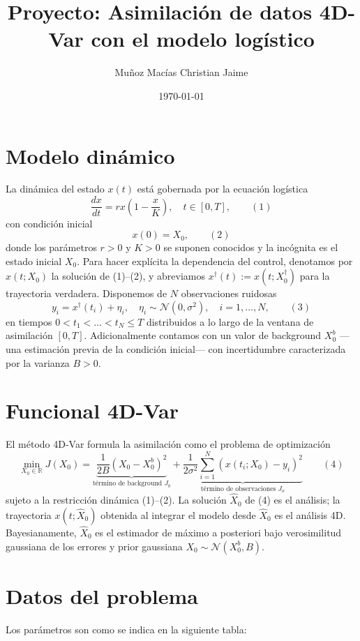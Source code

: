 \documentclass[12pt,spanish,mexico]{article}
\title{Proyecto: Asimilación de datos 4D-Var con el modelo logístico}
\author{Muñoz Macías Christian Jaime}
\date{\today}
\numberwithin{equation}{section}
\theoremstyle{definition}
\theoremstyle{remark}
\begin{document}
\maketitle

\section{Modelo dinámico}
La dinámica del estado \(x(t)\) está gobernada por la ecuación logística
\[
\frac{dx}{dt} = r x \left(1 - \frac{x}{K}\right), \quad t \in [0, T], \qquad (1)
\]
con condición inicial
\[
x(0) = X_0, \qquad (2)
\]
donde los parámetros \(r > 0\) y \(K > 0\) se suponen conocidos y la incógnita es el estado inicial \(X_0\). Para hacer explícita la dependencia del control, denotamos por \(x(t; X_0)\) la solución de (1)–(2), y abreviamos \(x^\dagger(t) := x(t; X_0^\dagger)\) para la trayectoria verdadera. Disponemos de \(N\) observaciones ruidosas
\[
y_i = x^\dagger(t_i) + \eta_i, \quad \eta_i \sim \mathcal{N}(0, \sigma^2), \quad i = 1, \dots, N, \qquad (3)
\]
en tiempos \(0 < t_1 < \dots < t_N \leq T\) distribuidos a lo largo de la ventana de asimilación \([0, T]\). Adicionalmente contamos con un valor de background \(X_0^b\) —una estimación previa de la condición inicial— con incertidumbre caracterizada por la varianza \(B > 0\).

\section{Funcional 4D-Var}
El método 4D-Var formula la asimilación como el problema de optimización
\[
\min_{X_0 \in \mathbb{R}} J(X_0) = \underbrace{\frac{1}{2B}(X_0 - X_0^b)^2}_{\text{término de background } J_b} + \underbrace{\frac{1}{2\sigma^2} \sum_{i=1}^N (x(t_i; X_0) - y_i)^2}_{\text{término de observaciones } J_o} \qquad (4)
\]
sujeto a la restricción dinámica (1)–(2). La solución \(\hat{X}_0\) de (4) es el análisis; la trayectoria \(x(t; \hat{X}_0)\) obtenida al integrar el modelo desde \(\hat{X}_0\) es el análisis 4D. Bayesianamente, \(\hat{X}_0\) es el estimador de máximo a posteriori bajo verosimilitud gaussiana de los errores y prior gaussiana \(X_0 \sim \mathcal{N}(X_0^b, B)\).

\section{Datos del problema}
Los parámetros son como se indica en la siguiente tabla:
\end{document}
